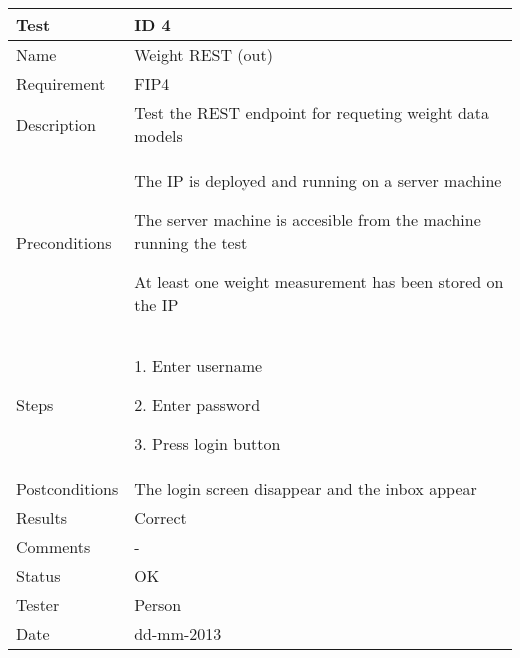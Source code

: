 \begin{table}
\begin{center}
\begin{tabular}{ | l | p{10cm} | }
	\hline
	\textbf{Test}	&	\textbf{ID 4} \\
	\hline\noalign{\smallskip}\noalign{\smallskip}\hline
	Name				& Weight REST (out) \\
	Requirement			& FIP4 \\
	Description			& Test the REST endpoint for requeting weight data models \\
	Preconditions		&	\par The IP is deployed and running on a server machine
							\par The server machine is accesible from the machine running the test
							\par At least one weight measurement has been stored on the IP \\
	Steps 				&	\par 1. Enter username
							\par 2. Enter password
							\par 3. Press login button \\
	Postconditions		& The login screen disappear and the inbox appear \\
	Results				& Correct \\
	Comments			& - \\
	Status				& OK \\
	Tester				& Person \\
	Date				& dd-mm-2013 \\
	\hline
\end{tabular}
\end{center}
\end{table}


